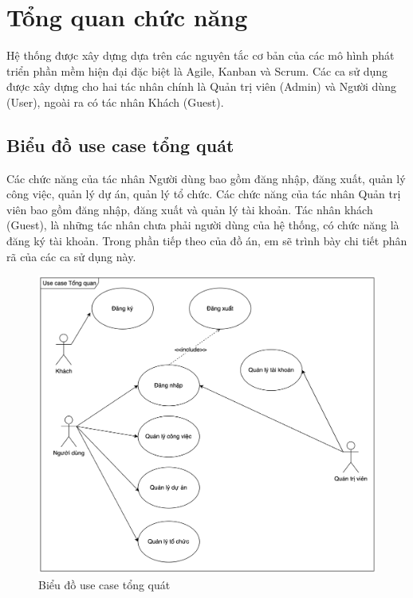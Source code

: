 \documentclass[../DoAn.tex]{subfiles}
\begin{document}
\section{Tổng quan chức năng}
\label{section:2.2}
Hệ thống được xây dựng dựa trên các nguyên tắc cơ bản của các mô hình phát triển phần mềm hiện đại đặc biệt là Agile, Kanban và Scrum.
Các ca sử dụng được xây dựng cho hai tác nhân chính là Quản trị viên (Admin) và Người dùng (User), ngoài ra có tác nhân Khách (Guest).

\subsection{Biểu đồ use case tổng quát}
\label{subsection:2.2.1}
Các chức năng của tác nhân Người dùng bao gồm đăng nhập, đăng xuất, quản lý công việc, quản lý dự án, quản lý tổ chức.
Các chức năng của tác nhân Quản trị viên bao gồm đăng nhập, đăng xuất và quản lý tài khoản.
Tác nhân khách (Guest), là những tác nhân chưa phải người dùng của hệ thống, có chức năng là đăng ký tài khoản.
Trong phần tiếp theo của đồ án, em sẽ trình bày chi tiết phân rã của các ca sử dụng này.
\begin{figure}[H]
    \centering
    \includegraphics[width=1.0\linewidth]{Hinhve/GeneralUseCases.png}
    \caption{Biểu đồ use case tổng quát}
    \label{fig:GeneralUseCases}
\end{figure}
\newpage
\end{document}
